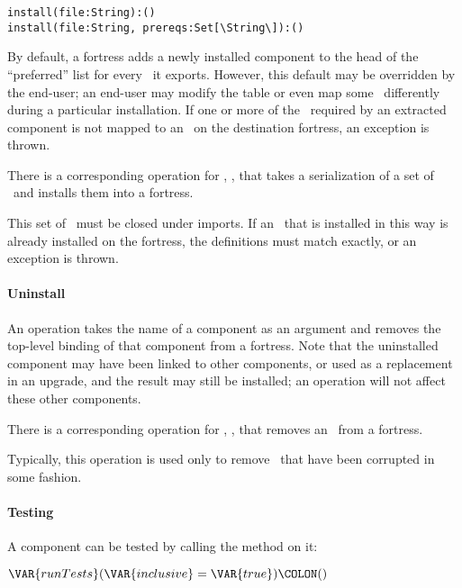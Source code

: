 {\small\verb+install(file:String):()+\\
\verb+install(file:String, prereqs:Set[\String\]):()+}


By default,
a fortress adds a newly installed component to the head of the
``preferred'' list for every \apiN\ it exports.
However, this default may be overridden by the end-user;
an end-user may modify the table
or even map some \apisN\ differently during a particular installation.
If one or more of the \apisN\ required by an extracted component
is not mapped to an \apiN\ on the destination fortress,
an exception is thrown.

There is a corresponding operation for \apisN,
, that takes a serialization of a set
of \apisN\ and installs them into a fortress.


This set of \apisN\ must be closed under imports. If an \apiN\
that is installed in this way is already installed on the fortress,
the definitions must match exactly,
or an exception is thrown.

\paragraph{Uninstall}
An  operation takes the name of a
component as an argument and
removes the top-level binding of that component from a fortress.
Note that the uninstalled component
may have been linked to other components,
or used as a replacement in an upgrade,
and the result may still be installed;
an  operation will not affect these other components.


There is a corresponding operation for \apisN,
, that removes an \apiN\ from a fortress.


Typically, this operation is used only to remove \apisN\
that have been corrupted in some fashion.

\paragraph{Testing}
A component can be tested by calling the method
\VAR{runTests} on it: 
\begin{Fortress}
\(\VAR{runTests}(\VAR{inclusive} = \VAR{true})\COLON ()\)
\end{Fortress}

